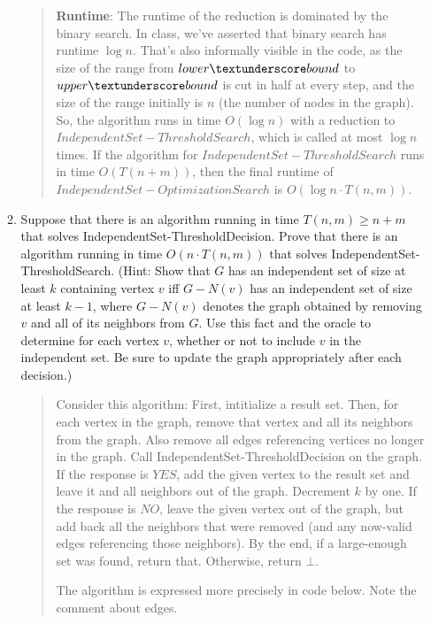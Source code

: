 \documentclass[11pt]{article}
\begin{document}
\begin{enumerate}
\begin{enumerate}
\begin{quote}
    \textbf{Runtime}: \newline 
    The runtime of the reduction is dominated by the binary search. In class, we've asserted that binary search has runtime $\log n$. That's also informally visible in the code, as the size of the range from $lower\textunderscore bound$ to $upper\textunderscore bound$ is cut in half at every step, and the size of the range initially is $n$ (the number of nodes in the graph). So, the algorithm runs in time $O(\log n)$ with a reduction to $IndependentSet-ThresholdSearch$, which is called at most $\log n$ times. If the algorithm for $IndependentSet-ThresholdSearch$ runs in time $O(T(n + m))$, then the final runtime of $IndependentSet-OptimizationSearch$ is $O(\log n \cdot T(n, m))$.
\end{quote}
 
  \item Suppose that there is an algorithm 
 running in time $T(n,m)\geq n+m$ that solves IndependentSet-ThresholdDecision.   Prove that there is an algorithm running in time $O(n\cdot T(n,m))$ that solves IndependentSet-ThresholdSearch.
(Hint: Show that $G$ has an independent set of size at least $k$ containing vertex $v$ iff $G-N(v)$ has an independent set of size at least $k-1$, where $G-N(v)$ denotes the graph obtained by removing $v$ and all of its neighbors from $G$.  Use this fact and the oracle to determine for each vertex $v$, whether or not to include $v$ in the independent set.  Be sure to update the graph appropriately after each decision.)

\begin{quote}
    \color{purple}
    Consider this algorithm: First, intitialize a result set. Then, for each vertex in the graph, remove that vertex and all its neighbors from the graph. Also remove all edges referencing vertices no longer in the graph. Call IndependentSet-ThresholdDecision on the graph. If the response is $YES$, add the given vertex to the result set and leave it and all neighbors out of the graph. Decrement $k$ by one. If the response is $NO$, leave the given vertex out of the graph, but add back all the neighbors that were removed (and any now-valid edges referencing those neighbors). By the end, if a large-enough set was found, return that. Otherwise, return $\bot$. \newline 
 
    The algorithm is expressed more precisely in code below. Note the comment about edges. \newline 


\end{quote}
\end{enumerate}
\end{enumerate}
\end{document}
